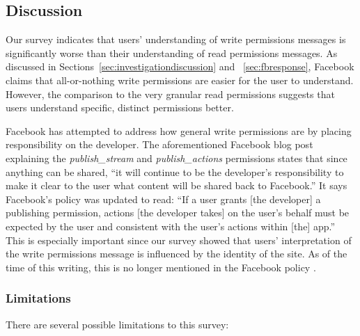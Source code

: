 \documentclass[10pt]{sig-alternate-10pt}
\begin{document}
\subsection{Discussion}

Our survey indicates that users' understanding of write permissions messages is significantly worse than their understanding of read permissions messages. As discussed in Sections~\ref{sec:investigationdiscussion} and ~\ref{sec:fbresponse}, Facebook claims that all-or-nothing write permissions are easier for the user to understand. However, the comparison to the very granular read permissions suggests that users understand specific, distinct permissions better.

Facebook has attempted to address how general write permissions are by placing responsibility on the developer. The aforementioned Facebook blog post explaining the \emph{publish\_stream} and \emph{publish\_actions} permissions \cite{publishperms} states that since anything can be shared, ``it will continue to be the developer's responsibility to make it clear to the user what content will be shared back to Facebook.'' It says Facebook's policy was updated to read: ``If a user grants [the developer] a publishing permission, actions [the developer takes] on the user’s behalf must be expected by the user and consistent with the user’s actions within [the] app.'' This is especially important since our survey showed that users' interpretation of the write permissions message is influenced by the identity of the site. As of the time of this writing, this is no longer mentioned in the Facebook policy \cite{fbpolicy}. 

\subsubsection{Limitations}
\label{sec:limitations}

There are several possible limitations to this survey:
\end{document}
